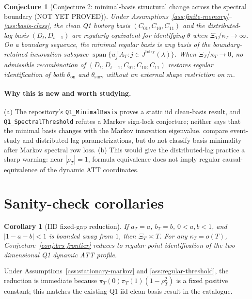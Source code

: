 \documentclass[11pt]{article}
\newcommand{\transpose}{\mathsf{T}}
\theoremstyle{definition}
\theoremstyle{plain}
\newtheorem{conjecture}{Conjecture}
\newtheorem{corollary}{Corollary}
\theoremstyle{remark}
\begin{document}
\begin{conjecture}[Conjecture 2: minimal-basis structural change across the spectral boundary (NOT YET PROVED)]\label{conj:minimal-basis-change}
Under Assumptions~\ref{ass:finite-memory}--\ref{ass:basis-class}, the clean Q1 history basis \((C_{01},C_{10},C_{11})\) and the distributed-lag basis \((D_t,D_{t-1})\) are regularly equivalent for identifying \(\theta\) when \(\Xi_T/\kappa_T\to\infty\).
On a boundary sequence, the minimal regular basis is any basis of the boundary-retained innovation subspace \(\operatorname{span}\{u_j^\transpose A_T:j\in J^{\mathrm{bdry}}(\lambda)\}\).
When \(\Xi_T/\kappa_T\to0\), no admissible recombination of \((D_t,D_{t-1},C_{01},C_{10},C_{11})\) restores regular identification of both \(\theta_{\mathrm{on}}\) and \(\theta_{\mathrm{surv}}\) without an external shape restriction on \(m\).
\end{conjecture}
\paragraph{Why this is new and worth studying.}
(a) The repository's \texttt{Q1\_MinimalBasis} proves a static iid clean-basis result, and \texttt{Q1\_SpectralThreshold} refutes a Markov sign-lock conjecture; neither says that the minimal basis changes with the Markov innovation eigenvalue.
\citet{schmidheiny2023event} compare event-study and distributed-lag parametrizations, but do not classify basis minimality after Markov spectral row loss.
(b) This would give the \citet{schmidheiny2023event} distributed-lag practice a sharp warning: near \(|\rho_T|=1\), formula equivalence does not imply regular causal-equivalence of the dynamic ATT coordinates.

\section{Sanity-check corollaries}
\begin{corollary}[IID fixed-gap reduction]\label{cor:iid-fixed-gap}
If \(a_T=a\), \(b_T=b\), \(0<a,b<1\), and \(|1-a-b|<1\) is bounded away from \(1\), then \(\Xi_T\asymp T\).
For any \(\kappa_T=o(T)\), Conjecture~\ref{conj:brs-frontier} reduces to regular point identification of the two-dimensional Q1 dynamic ATT profile.
\end{corollary}
Under Assumptions~\ref{ass:stationary-markov} and \ref{ass:regular-threshold}, the reduction is immediate because \(\pi_T(0)\pi_T(1)(1-\rho_T^2)\) is a fixed positive constant; this matches the existing Q1 iid clean-basis result in the catalogue.
\end{document}
